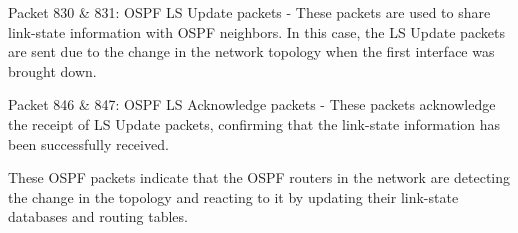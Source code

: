 Packet 830 \& 831: OSPF LS Update packets - These packets are used to share link-state information with OSPF neighbors. In this case, the LS Update packets are sent due to the change in the network topology when the first interface was brought down.

Packet 846 \& 847: OSPF LS Acknowledge packets - These packets acknowledge the receipt of LS Update packets, confirming that the link-state information has been successfully received.

These OSPF packets indicate that the OSPF routers in the network are detecting the change in the topology and reacting to it by updating their link-state databases and routing tables.